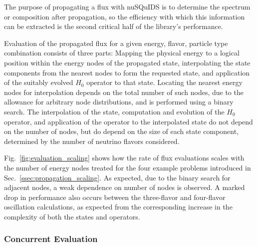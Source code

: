 \documentclass[3p,12pt]{elsarticle}
\newcommand{\ttf}{\ttfamily}
\begin{document}
The purpose of propagating a flux with {\ttf nuSQuIDS} is to determine the spectrum or composition after propagation, so the efficiency with which this information can be extracted is the second critical half of the library's performance. 

Evaluation of the propagated flux for a given energy, flavor, particle type combination consists of three parts: Mapping the physical energy to a logical position within the energy nodes of the propagated state, interpolating the state components from the nearest nodes to form the requested state, and application of the suitably evolved $H_0$ operator to that state. 
Locating the nearest energy nodes for interpolation depends on the total number of such nodes, due to the allowance for arbitrary node distributions, and is performed using a binary search. 
The interpolation of the state, computation and evolution of the $H_0$ operator, and application of the operator to the interpolated state do not depend on the number of nodes, but do depend on the size of each state component, determined by the number of neutrino flavors considered. 

Fig.~\ref{fig:evaluation_scaling} shows how the rate of flux evaluations scales with the number of energy nodes treated for the four example problems introduced in Sec.~\ref{ssec:propagation_scaling}. 
As expected, due to the binary search for adjacent nodes, a weak dependence on number of nodes is observed. 
A marked drop in performance also occurs between the three-flavor and four-flavor oscillation calculations, as expected from the corresponding increase in the complexity of both the states and operators. 

\subsubsection{Concurrent Evaluation}
\end{document}
